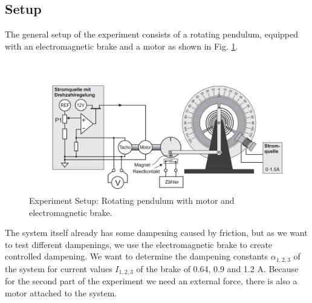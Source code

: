 \subsection{Setup}
The general setup of the experiment consists of a rotating pendulum, equipped with an electromagnetic brake and a motor as shown in Fig. \ref{fig::setup}.
\begin{figure} [ht]
	\centering
	\includegraphics[width=400pt]{img/setup.PNG}
	\caption{Experiment Setup: Rotating pendulum with motor and electromagnetic brake. \cite{manual}}
	\label{fig::setup}
\end{figure}

The system itself already has some dampening caused by friction, but as we want to test different dampenings, we use the electromagnetic brake to create controlled dampening.
We want to determine the dampening constants $\alpha_{1, 2, 3}$ of the system for current values $I_{1, 2, 3}$ of the brake of 0.64, 0.9 and 1.2 A.
Because for the second part of the experiment we need an external force, there is also a motor attached to the system.